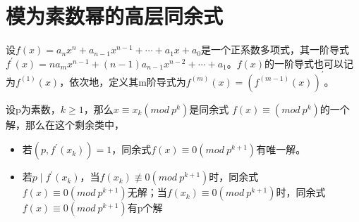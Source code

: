 \documentclass[cn,10pt]{elegantbook}
\begin{document}
\section{模为素数幂的高层同余式}
\begin{definition}
  设$f(x) = a_nx^n+a_{n-1}x^{n-1}+ \cdots +a_1x+a_0$是一个正系数多项式，其一阶导式$f^{\prime}(x) = na_mx^{n-1}+(n-1)a_{n-1}x^{n-2}+ \cdots +a_1$。$f(x)$的一阶导式也可以记为$f^{(1)}(x)$，依次地，定义其m阶导式为$f^{(m)}(x) = (f^{(m-1)}(x))^{\prime}$。
\end{definition}
\begin{theorem}[构造所有解]
  设p为素数，$k \geq 1$，那么$x \equiv x_k(mod\ p^k)$是同余式
  $f(x) \equiv (mod\ p^k)$的一个解，那么在这个剩余类中，
  \begin{itemize}
    \item 若$(p,f^{\prime}(x_k)) = 1$，同余式$f(x) \equiv 0(mod\ p^{k+1})$有唯一解。
    \item 若$p \mid f^{\prime}(x_k)$，当$f(x_k) \not\equiv 0(mod\ p^{k+1})$时，同余式$f(x) \equiv 0(mod\ p^{k+1})$无解；当$f(x_k) \equiv 0(mod\ p^{k+1})$时，同余式$f(x) \equiv 0(mod\ p^{k+1})$有p个解
  \end{itemize}
\end{theorem}
\end{document}
